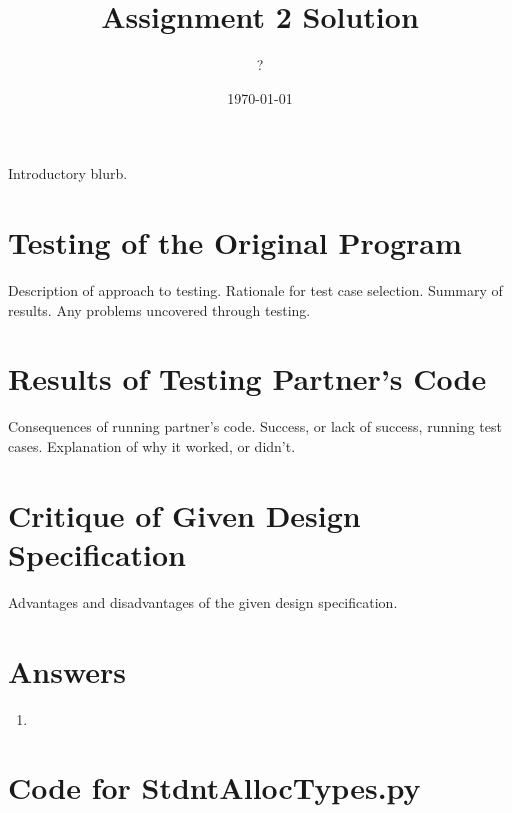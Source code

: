 \documentclass[12pt]{article}
\title{Assignment 2 Solution}
\author{?}
\date{\today}
\begin{document}
\maketitle

Introductory blurb.

\section{Testing of the Original Program}

Description of approach to testing.  Rationale for test case selection.  Summary
of results.  Any problems uncovered through testing.

\section{Results of Testing Partner's Code}

Consequences of running partner's code.  Success, or lack of success, running
test cases.  Explanation of why it worked, or didn't.

\section{Critique of Given Design Specification}

Advantages and disadvantages of the given design specification.

\section{Answers}

\begin{enumerate}

\item 

\end{enumerate}

\newpage

\lstset{language=Python, basicstyle=\tiny, breaklines=true, showspaces=false,
  showstringspaces=false, breakatwhitespace=true}

\def\thesection{\Alph{section}}

\section{Code for StdntAllocTypes.py}

\noindent 
\end{document}
